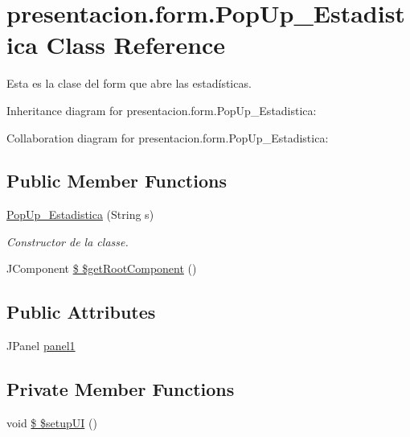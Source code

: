 \hypertarget{classpresentacion_1_1form_1_1PopUp__Estadistica}{}\section{presentacion.\+form.\+Pop\+Up\+\_\+\+Estadistica Class Reference}
\label{classpresentacion_1_1form_1_1PopUp__Estadistica}


Esta es la clase del form que abre las estadísticas.  




Inheritance diagram for presentacion.\+form.\+Pop\+Up\+\_\+\+Estadistica\+:


Collaboration diagram for presentacion.\+form.\+Pop\+Up\+\_\+\+Estadistica\+:
\subsection*{Public Member Functions}
\begin{DoxyCompactItemize}
\item 
\hyperlink{classpresentacion_1_1form_1_1PopUp__Estadistica_a7f2277129654afa8b98cf5c48427b023}{Pop\+Up\+\_\+\+Estadistica} (String s)
\begin{DoxyCompactList}\small\item\em Constructor de la classe. \end{DoxyCompactList}\item 
J\+Component \hyperlink{classpresentacion_1_1form_1_1PopUp__Estadistica_afce5f0f85c8ea9dd27b7744063f3da6f}{\$ \$get\+Root\+Component} ()
\end{DoxyCompactItemize}
\subsection*{Public Attributes}
\begin{DoxyCompactItemize}
\item 
J\+Panel \hyperlink{classpresentacion_1_1form_1_1PopUp__Estadistica_ac276266d42b873f89883dd3a869feadf}{panel1}
\end{DoxyCompactItemize}
\subsection*{Private Member Functions}
\begin{DoxyCompactItemize}
\item 
void \hyperlink{classpresentacion_1_1form_1_1PopUp__Estadistica_a3d9efe7430fbea6b3db7fc7fa7ca89ee}{\$ \$setup\+UI} ()
\end{DoxyCompactItemize}
